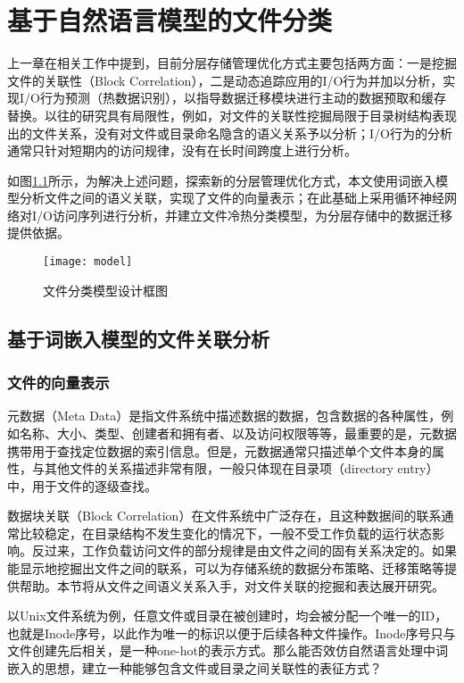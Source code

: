 \chapter{基于自然语言模型的文件分类}

上一章在相关工作中提到，目前分层存储管理优化方式主要包括两方面：一是挖掘文件的关联性（Block Correlation），二是动态追踪应用的I/O行为并加以分析，实现I/O行为预测（热数据识别），以指导数据迁移模块进行主动的数据预取和缓存替换。以往的研究具有局限性，例如，对文件的关联性挖掘局限于目录树结构表现出的文件关系，没有对文件或目录命名隐含的语义关系予以分析；I/O行为的分析通常只针对短期内的访问规律，没有在长时间跨度上进行分析。

如图\ref{fig:model}所示，为解决上述问题，探索新的分层管理优化方式，本文使用词嵌入模型分析文件之间的语义关联，实现了文件的向量表示；在此基础上采用循环神经网络对I/O访问序列进行分析，并建立文件冷热分类模型，为分层存储中的数据迁移提供依据。
\begin{figure}[htp]
\centering
\texttt{[image: model]}
\caption{文件分类模型设计框图}
\label{fig:model}
\end{figure}





\section{基于词嵌入模型的文件关联分析}
\subsection{文件的向量表示}
元数据（Meta Data）是指文件系统中描述数据的数据，包含数据的各种属性，例如名称、大小、类型、创建者和拥有者、以及访问权限等等，最重要的是，元数据携带用于查找定位数据的索引信息。但是，元数据通常只描述单个文件本身的属性，与其他文件的关系描述非常有限，一般只体现在目录项（directory entry）中，用于文件的逐级查找。

数据块关联（Block Correlation）在文件系统中广泛存在，且这种数据间的联系通常比较稳定，在目录结构不发生变化的情况下，一般不受工作负载的运行状态影响。反过来，工作负载访问文件的部分规律是由文件之间的固有关系决定的。如果能显示地挖掘出文件之间的联系，可以为存储系统的数据分布策略、迁移策略等提供帮助。本节将从文件之间语义关系入手，对文件关联的挖掘和表达展开研究。

以Unix文件系统为例，任意文件或目录在被创建时，均会被分配一个唯一的ID，也就是Inode序号，以此作为唯一的标识以便于后续各种文件操作。Inode序号只与文件创建先后相关，是一种one-hot的表示方式。那么能否效仿自然语言处理中词嵌入的思想，建立一种能够包含文件或目录之间关联性的表征方式？

